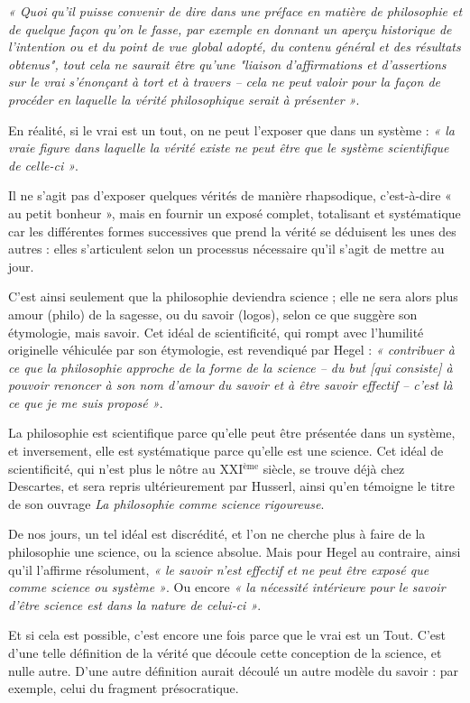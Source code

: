 {\it « Quoi qu’il puisse convenir de dire dans une préface en matière de philosophie et de quelque façon qu’on le fasse, par exemple en donnant un aperçu historique de l’intention ou et du point de vue global adopté, du contenu général et des résultats obtenus", tout cela ne saurait être qu’une "liaison d’affirmations et d’assertions sur le vrai s’énonçant à tort et à travers – cela ne peut valoir pour la façon de procéder en laquelle la vérité philosophique serait à présenter »}.

En réalité, si le vrai est un tout, on ne peut l’exposer que dans un système : {\it « la vraie figure dans laquelle la vérité existe ne peut être que le système scientifique de celle-ci »}.

Il ne s’agit pas d’exposer quelques vérités de manière rhapsodique, c’est-à-dire « au petit bonheur », mais en fournir un exposé complet, totalisant et systématique car les différentes formes successives que prend la vérité se déduisent les unes des autres : elles s’articulent selon un processus nécessaire qu’il s’agit de mettre au jour.

C’est ainsi seulement que la philosophie deviendra science ; elle ne sera alors plus amour (philo) de la sagesse, ou du savoir (logos), selon ce que suggère son étymologie, mais savoir. Cet idéal de scientificité, qui rompt avec l’humilité originelle véhiculée par son étymologie, est revendiqué par Hegel : {\it « contribuer à ce que la philosophie approche de la forme de la science – du but [qui consiste] à pouvoir renoncer à son nom d’amour du savoir et à être savoir effectif – c’est là ce que je me suis proposé »}.

La philosophie est scientifique parce qu’elle peut être présentée dans un système, et inversement, elle est systématique parce qu’elle est une science. Cet idéal de scientificité, qui n’est plus le nôtre au {\footnotesize XXI}$^\text{ème}$ siècle, se trouve déjà chez Descartes, et sera repris ultérieurement par Husserl, ainsi qu’en témoigne le titre de son ouvrage {\it La philosophie comme science rigoureuse}.

De nos jours, un tel idéal est discrédité, et l’on ne cherche plus à faire de la philosophie une science, ou la science absolue. Mais pour Hegel au contraire, ainsi qu’il l’affirme résolument, {\it « le savoir n’est effectif et ne peut être exposé que comme science ou système »}. Ou encore {\it « la nécessité intérieure pour le savoir d’être science est dans la nature de celui-ci »}.

Et si cela est possible, c’est encore une fois parce que le vrai est un Tout. C’est d’une telle définition de la vérité que découle cette conception de la science, et nulle autre. D’une autre définition aurait découlé un autre modèle du savoir : par exemple, celui du fragment présocratique.

